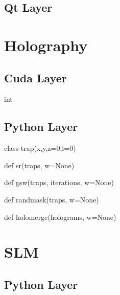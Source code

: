 \documentclass{report}
\begin{document}
\subsection{Qt Layer}

\section{Holography}

\subsection{Cuda Layer}

int 


\subsection{Python Layer}

class trap(x,y,z=0,l=0)

def sr(traps, w=None)

def gsw(traps, iterations, w=None)

def randmask(traps, w=None)

def holomerge(holograms, w=None)

\section{SLM}

\subsection{Python Layer}
\end{document}
